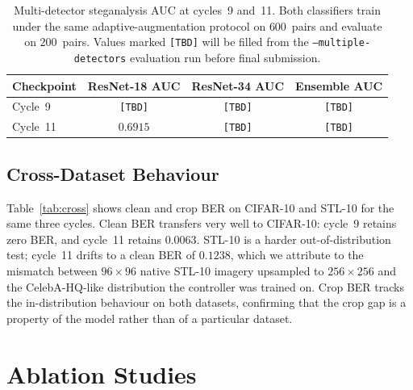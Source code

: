 \documentclass[journal]{IEEEtran}
\begin{document}
\begin{table}[t]
\centering
\caption{Multi-detector steganalysis AUC at cycles~9 and~11.  Both
classifiers train under the same adaptive-augmentation protocol on
$600$~pairs and evaluate on $200$~pairs.  Values marked
\texttt{[TBD]} will be filled from the \texttt{--multiple-detectors}
evaluation run before final submission.}
\label{tab:detectors}
\begin{tabular}{l c c c}
\toprule
Checkpoint & ResNet-18 AUC & ResNet-34 AUC & Ensemble AUC \\
\midrule
Cycle~9   & \texttt{[TBD]} & \texttt{[TBD]} & \texttt{[TBD]} \\
Cycle~11  & $0.6915$       & \texttt{[TBD]} & \texttt{[TBD]} \\
\bottomrule
\end{tabular}
\end{table}

\subsection{Cross-Dataset Behaviour}
Table~\ref{tab:cross} shows clean and crop BER on CIFAR-10 and
STL-10 for the same three cycles. Clean BER transfers very well to
CIFAR-10: cycle~9 retains zero BER, and cycle~11 retains $0.0063$.
STL-10 is a harder out-of-distribution test; cycle~11 drifts to a
clean BER of $0.1238$, which we attribute to the mismatch between
$96{\times}96$ native STL-10 imagery upsampled to $256{\times}256$
and the CelebA-HQ-like distribution the controller was trained on.
Crop BER tracks the in-distribution behaviour on both datasets,
confirming that the crop gap is a property of the model rather than
of a particular dataset.

\begin{table}[t]
\centering
\caption{Post-fix cross-dataset behaviour. CIFAR and STL columns
give clean BER and crop~Q80 BER after bicubic upsampling to the
native resolution.}
\label{tab:cross}
\end{table}

\section{Ablation Studies}
\label{sec:ablations}
\end{document}

